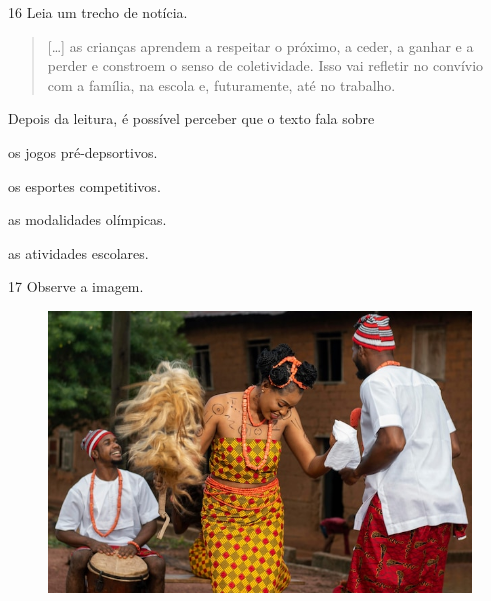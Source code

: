 \pagebreak
\num{16} Leia um trecho de notícia.
\begin{quote}
  {[}\ldots{}{]} as crianças aprendem a respeitar o próximo, a ceder, a
  ganhar e a perder e constroem o senso de coletividade. Isso vai
  refletir no convívio com a família, na escola e, futuramente, até no
  trabalho.

\end{quote}

\noindent{}Depois da leitura, é possível perceber que o texto fala sobre

\begin{escolha}
\item os jogos pré-depsortivos.

\item os esportes competitivos.

\item as modalidades olímpicas.

\item as atividades escolares.
\end{escolha}



\pagebreak
\num{17} Observe a imagem.
  \begin{figure}[htpb!]
\includegraphics[width=\textwidth]{./imgs/img15.jpg}
\end{figure}

